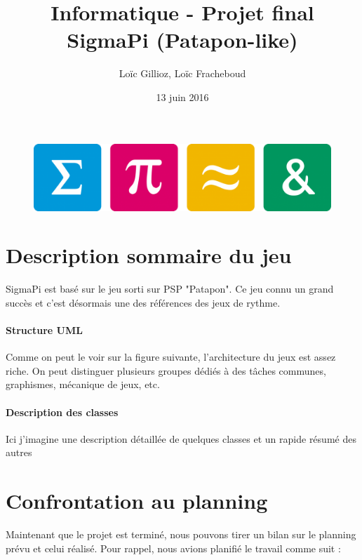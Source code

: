 \documentclass[a4paper,10pt]{article}
\author{Loïc Gillioz, Loïc Fracheboud}
\title{Informatique - Projet final \\ \Huge SigmaPi (Patapon-like)}
\date{13 juin 2016}
\begin{document}
 \maketitle
 \begin{figure}[!h]
 \centering
 \includegraphics[scale=0.15]{images/icones}
 \end{figure}
 \pagebreak
 
 \section{Description sommaire du jeu}
  SigmaPi est basé sur le jeu sorti sur PSP "Patapon". Ce jeu connu un grand succès et c'est désormais une des références des jeux de rythme.
  \paragraph*{Structure UML}
  Comme on peut le voir sur la figure suivante, l'architecture du jeux est assez riche. On peut distinguer plusieurs groupes dédiés à des tâches communes, graphismes, mécanique de jeux, etc.
  \paragraph*{Description des classes}
Ici j'imagine une description détaillée de quelques classes et un rapide résumé des autres
  \section{Confrontation au planning}
  Maintenant que le projet est terminé, nous pouvons tirer un bilan sur le planning prévu et celui réalisé. Pour rappel, nous avions planifié le travail comme suit :
\end{document}
